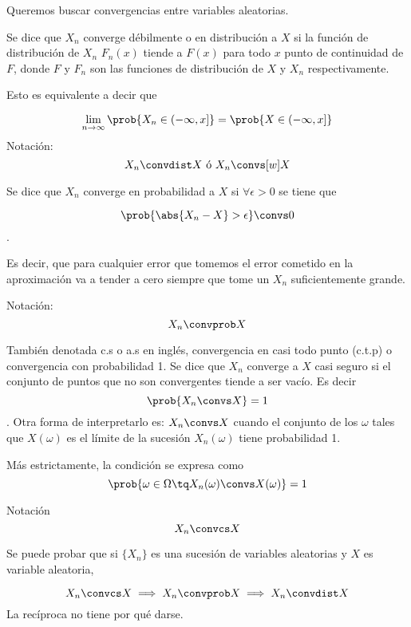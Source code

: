 \documentclass{apuntes}
\begin{document}
Queremos buscar convergencias entre variables aleatorias.

\begin{defn}

Se dice que $X_n$ converge débilmente o en distribución a $X$ si la función de distribución de $X_n$ $F_n(x)$ tiende a $F(x)$ para todo $x$ punto de continuidad de $F$, donde $F$ y $F_n$ son las funciones de distribución de $X$ y $X_n$ respectivamente.

Esto es equivalente a decir que  

\[\lim_{n\to\infty} \prob{X_n\in (-\infty, x]} = \prob{X\in (-\infty, x]} \]
Notación:
\[ X_n  \convdist X \text{ ó }  X_n \convs[w] X \] 
\end{defn}

\begin{defn} 
Se dice que $X_n$ converge en probabilidad a $X$ si $\forall \epsilon > 0$ se tiene que 

\[\prob{\abs{X_n-X} > \epsilon} \convs 0 \].

 Es decir, que para cualquier error que tomemos el error cometido en la aproximación va a tender a cero siempre que tome un $X_n$ suficientemente grande.

Notación: \[ X_n \convprob X \]
\end{defn}

\begin{defn} También denotada c.s o a.s en inglés, convergencia en casi todo punto (c.t.p) o convergencia con probabilidad 1. Se dice que $X_n$ converge a $X$ casi seguro si el conjunto de puntos que no son convergentes tiende a ser vacío. Es decir \[ \prob{X_n \convs X} = 1\]. Otra forma de interpretarlo es: $X_n \convs X$ cuando el conjunto de los $\omega$ tales que $X(\omega)$ es el límite de la sucesión $X_n(\omega)$ tiene probabilidad 1.

Más estrictamente, la condición se expresa como \[\prob{\omega \in \Omega\tq X_n(\omega) \convs X(\omega)} = 1\]

Notación \[ X_n\convcs X \]
\end{defn}


\begin{theorem}Se puede probar que si $\{X_n\}$ es una sucesión de variables aleatorias y $X$ es variable aleatoria, 

\[ X_n\convcs X \implies X_n \convprob X \implies X_n \convdist X \]
La recíproca no tiene por qué darse.
\end{theorem}
\end{document}
